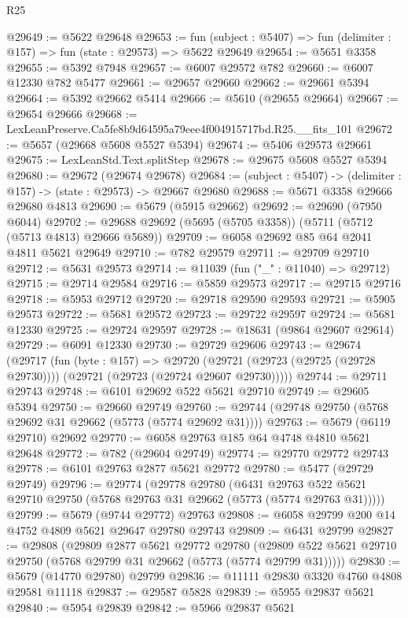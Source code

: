 \begin{lexlean}{R25}
\begin{coremodule}
@29649 := @5622 @29648
@29653 := fun (subject : @5407) => fun (delimiter : @157) => fun (state : @29573) => @5622 @29649
@29654 := @5651 @3358
@29655 := @5392 @7948
@29657 := @6007 @29572 @782
@29660 := @6007 @12330 @782 @5477
@29661 := @29657 @29660
@29662 := @29661 @5394
@29664 := @5392 @29662 @5414
@29666 := @5610 (@29655 @29664)
@29667 := @29654 @29666
@29668 := LexLeanPreserve.Ca5fe8b9d64595a79eee4f004915717bd.R25.__fits_101
@29672 := @5657 (@29668 @5608 @5527 @5394)
@29674 := @5406 @29573 @29661
@29675 := LexLeanStd.Text.splitStep
@29678 := @29675 @5608 @5527 @5394
@29680 := @29672 (@29674 @29678)
@29684 := (subject : @5407) -> (delimiter : @157) -> (state : @29573) -> @29667 @29680
@29688 := @5671 @3358 @29666 @29680 @4813
@29690 := @5679 (@5915 @29662)
@29692 := @29690 (@7950 @6044)
@29702 := @29688 @29692 (@5695 (@5705 @3358)) (@5711 (@5712 (@5713 @4813) @29666 @5689))
@29709 := @6058 @29692 @85 @64 @2041 @4811 @5621 @29649
@29710 := @782 @29579
@29711 := @29709 @29710
@29712 := @5631 @29573
@29714 := @11039 (fun ("_" : @11040) => @29712)
@29715 := @29714 @29584
@29716 := @5859 @29573
@29717 := @29715 @29716
@29718 := @5953 @29712
@29720 := @29718 @29590 @29593
@29721 := @5905 @29573
@29722 := @5681 @29572
@29723 := @29722 @29597
@29724 := @5681 @12330
@29725 := @29724 @29597
@29728 := @18631 (@9864 @29607 @29614)
@29729 := @6091 @12330
@29730 := @29729 @29606
@29743 := @29674
    (@29717
      (fun (byte : @157) =>
      @29720 (@29721 (@29723 (@29725 (@29728 @29730)))) (@29721 (@29723 (@29724 @29607 @29730)))))
@29744 := @29711 @29743
@29748 := @6101 @29692 @522 @5621 @29710
@29749 := @29605 @5394
@29750 := @29660 @29749
@29760 := @29744 (@29748 @29750 (@5768 @29692 @31 @29662 (@5773 (@5774 @29692 @31))))
@29763 := @5679 (@6119 @29710) @29692
@29770 := @6058 @29763 @185 @64 @4748 @4810 @5621 @29648
@29772 := @782 (@29604 @29749)
@29774 := @29770 @29772 @29743
@29778 := @6101 @29763 @2877 @5621 @29772
@29780 := @5477 (@29729 @29749)
@29796 := @29774
    (@29778
      @29780
      (@6431 @29763 @522 @5621 @29710 @29750 (@5768 @29763 @31 @29662 (@5773 (@5774 @29763 @31)))))
@29799 := @5679 (@9744 @29772) @29763
@29808 := @6058 @29799 @200 @14 @4752 @4809 @5621 @29647 @29780 @29743
@29809 := @6431 @29799
@29827 := @29808
    (@29809
      @2877
      @5621
      @29772
      @29780
      (@29809 @522 @5621 @29710 @29750 (@5768 @29799 @31 @29662 (@5773 (@5774 @29799 @31)))))
@29830 := @5679 (@14770 @29780) @29799
@29836 := @11111 @29830 @3320 @4760 @4808 @29581 @11118
@29837 := @29587 @5828
@29839 := @5955 @29837 @5621
@29840 := @5954 @29839
@29842 := @5966 @29837 @5621

\end{coremodule}
\end{lexlean}
